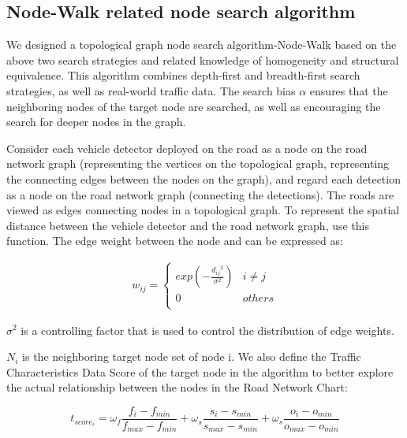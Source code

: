 \documentclass[conference]{IEEEtran}
\begin{document}
\subsection{Node-Walk related node search algorithm}
\par
We designed a topological graph node search algorithm-Node-Walk based on the above two search strategies and related knowledge of homogeneity and structural equivalence. This algorithm combines depth-first and breadth-first search strategies, as well as real-world traffic data. The search bias $\alpha$  ensures that the neighboring nodes of the target node are searched, as well as encouraging the search for deeper nodes in the graph. 
\par
Consider each vehicle detector deployed on the road as a node on the road network graph (representing the vertices on the topological graph, representing the connecting edges between the nodes on the graph), and regard each detection as a node on the road network graph (connecting the detections). The roads are viewed as edges connecting nodes in a topological graph. To represent the spatial distance between the vehicle detector and the road network graph, use this function. The edge weight between the node and can be expressed as:

\begin{eqnarray}
w_{ij} =
\begin{cases}
exp	\left( -{\frac{{d_{ij}}^2}{\sigma ^2}} \right)   & i\neq j \\
0  & others \\
\end{cases}
\end{eqnarray}  

\par
$\sigma ^2$ is a controlling factor that is used to control the distribution of edge weights.
\par
$N_i$ is the neighboring target node set of node i. We also define the Traffic Characteristics Data Score of the target node in the algorithm to better explore the actual relationship between the nodes in the Road Network Chart:

\begin{equation}
    t_{{score}_i}=\omega _f \frac{f_i - f_{min}}{f_{max} - f_{min}} + \omega_s \frac{s_i - s_{min}}{s_{max} - s_{min}} + \omega_s \frac{o_i - o_{min}}{o_{max} - o_{min}}
\end{equation}  
\end{document}
